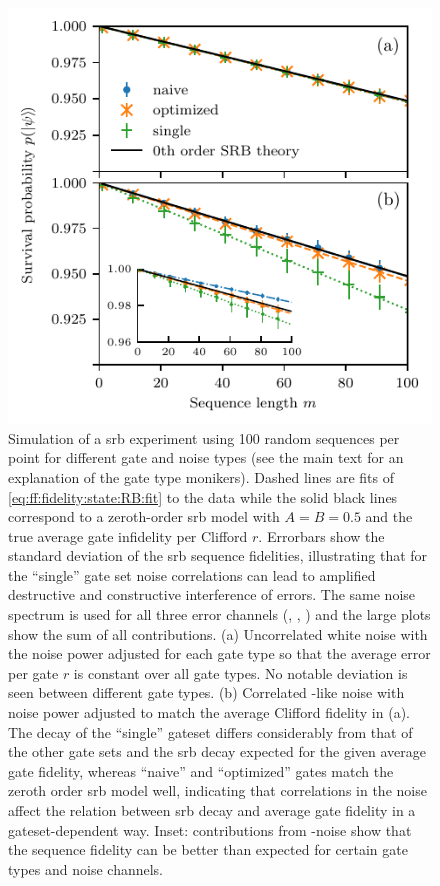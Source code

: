 \begin{figure}[tbp]
    \centering
    \includegraphics{img/pdf/RB_naive-optimized-single_gates_white_vs_correl_with_Z_noise_inset.pdf}
    \caption{
        Simulation of a \gls{srb} experiment using \num{100} random sequences per point for different gate and noise types (see the main text for an explanation of the gate type monikers).
        Dashed lines are fits of \cref{eq:ff:fidelity:state:RB:fit} to the data while the solid black lines correspond to a zeroth-order \gls{srb} model with $A=B=\num{0.5}$ and the true average gate infidelity per Clifford $r$.
        Errorbars show the standard deviation of the \gls{srb} sequence fidelities, illustrating that for the \enquote{single} gate set noise correlations can lead to amplified destructive and constructive interference of errors.
        The same noise spectrum is used for all three error channels (\px, \py, \pz) and the large plots show the sum of all contributions.
        (a) Uncorrelated white noise with the noise power adjusted for each gate type so that the average error per gate $r$ is constant over all gate types.
        No notable deviation is seen between different gate types.
        (b) Correlated \oneoverf-like noise with noise power adjusted to match the average Clifford fidelity in (a).
        The decay of the \enquote{single} gateset differs considerably from that of the other gate sets and the \gls{srb} decay expected for the given average gate fidelity, whereas \enquote{naive} and \enquote{optimized} gates match the zeroth order \gls{srb} model well, indicating that correlations in the noise affect the relation between \gls{srb} decay and average gate fidelity in a gateset-dependent way.
        Inset: contributions from \pz-noise show that the sequence fidelity can be better than expected for certain gate types and noise channels.
    }
    \label{fig:ff:randomized_benchmarking:noise_comparison}
\end{figure}

